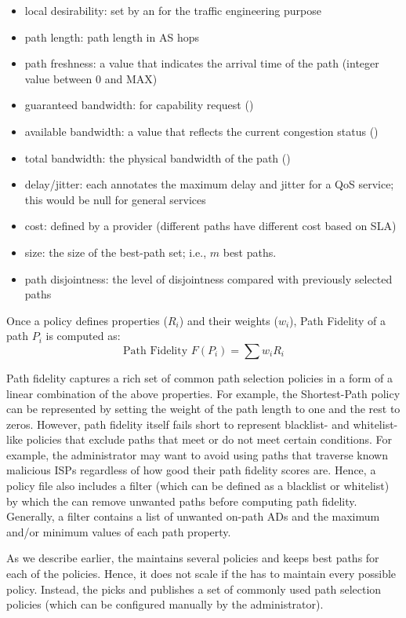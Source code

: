 \begin{itemize}
\item{local desirability: } set by an \AD for the traffic engineering purpose
\item{path length: } path length in AS hops
\item{path freshness: } a value that indicates the arrival time of the path (integer value between 0 and MAX) 
\item{guaranteed bandwidth: } for capability request (\stride) 
\item{available bandwidth: } a value that reflects the current congestion status (\stride)
\item{total bandwidth: } the physical bandwidth of the path (\stride)
\item{delay/jitter: } each \AD annotates the maximum delay and jitter for a QoS service; this would be null for general services
\item{cost: } defined by a provider (different paths have different cost based on SLA)
\item{size: } the size of the best-path set; i.e., $m$ best paths.
\item{path disjointness: } the level of disjointness compared with
  previously selected paths
\end{itemize}

Once a policy defines properties ($R_i$) and their weights ($w_i$), Path Fidelity of a path $P_i$ is computed as:
\[
\textrm{Path Fidelity } F (P_i) = \sum w_i R_i
\]

Path fidelity captures a rich set of common path selection policies in
a form of a linear combination of the above properties. For example,
the Shortest-Path policy can be represented by setting the weight of
the path length to one and the rest to zeros.  However, path fidelity
itself fails short to represent blacklist- and whitelist-like policies
that exclude paths that meet or do not meet certain conditions. For
example, the administrator may want to avoid using paths that traverse
known malicious ISPs regardless of how good their path fidelity scores
are. Hence, a policy file also includes a filter (which can be defined
as a blacklist or whitelist) by which the \pse can remove unwanted
paths before computing path fidelity. Generally, a filter contains a
list of unwanted on-path ADs and the maximum and/or minimum values of
each path property.

As we describe earlier, the \pse maintains several policies and keeps
best paths for each of the policies. Hence, it does not scale if the
\pse has to maintain every possible policy. Instead, the \pse picks
and publishes a set of commonly used path selection policies (which
can be configured manually by the administrator). 

